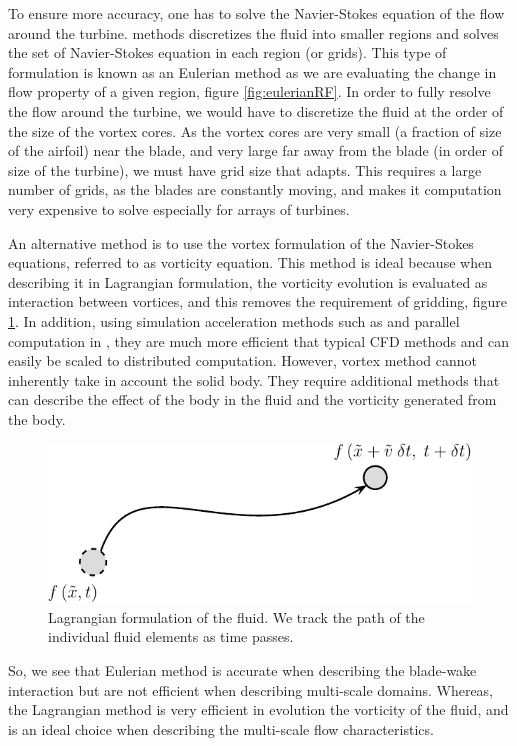 To ensure more accuracy, one has to solve the Navier-Stokes equation of the flow around the turbine.  methods discretizes the fluid into smaller regions and solves the set of Navier-Stokes equation in each region (or grids). This type of formulation is known as an Eulerian method as we are evaluating the change in flow property of a given region, figure \ref{fig:eulerianRF}. In order to fully resolve the flow around the turbine, we would have to discretize the fluid at the order of the size of the vortex cores. As the vortex cores are very small (a fraction of size of the airfoil) near the blade, and very large far away from the blade (in order of size of the turbine), we must have grid size that adapts. This requires a large number of grids, as the blades are constantly  moving, and makes it computation very expensive to solve especially for arrays of turbines.

An alternative method is to use the vortex formulation of the Navier-Stokes equations, referred to as vorticity equation. This method is ideal because when describing it in Lagrangian formulation, the vorticity evolution is evaluated as interaction between vortices, and this removes the requirement of gridding, figure \ref{fig:lagrangianRF}. In addition, using simulation acceleration methods such as  and parallel computation in , they are much more efficient that typical CFD methods and can easily be scaled to distributed computation. However, vortex method cannot inherently take in account the solid body. They require additional methods that can describe the effect of the body in the fluid and the vorticity generated from the body.

	\begin{figure}[!t]
		\centering
		\includegraphics[width=0.4\linewidth]{figures/introduction/lagrangianRF2-crop.pdf}
		\caption{Lagrangian formulation of the fluid. We track the path of the individual fluid elements as time passes.}
		\label{fig:lagrangianRF}
	\end{figure}

So, we see that Eulerian method is accurate when describing the blade-wake interaction but are not efficient when describing multi-scale domains. Whereas, the Lagrangian method is very efficient in evolution the vorticity of the fluid, and is an ideal choice when describing the multi-scale flow characteristics. 

